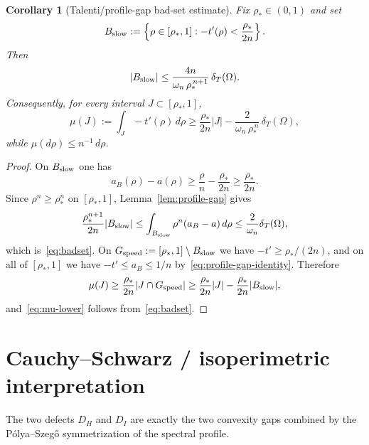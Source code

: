 \documentclass[11pt]{article}
\newtheorem{corollary}[theorem]{Corollary}
\theoremstyle{definition}
\newcommand{\Om}{\Omega}
\newcommand{\rstar}{\rho_{*}}
\begin{document}
\begin{corollary}[Talenti/profile-gap bad-set estimate]\label{cor:badset}
Fix $\rstar\in(0,1)$ and set
\[
   B_{\rm slow}:=\left\{\rho\in[\rstar,1]:
      -t'(\rho)<\frac{\rstar}{2n}\right\}.
\]
Then
\begin{equation}\label{eq:badset}
   |B_{\rm slow}|
   \le \frac{4n}{\omega_n\,\rstar^{\,n+1}}\,\delta_T(\Om).
\end{equation}
Consequently, for every interval $J\subset[\rstar,1]$,
\begin{equation}\label{eq:mu-lower}
   \mu(J):=\int_J -t'(\rho)\,d\rho
   \ge \frac{\rstar}{2n}|J|
      -\frac{2}{\omega_n\,\rstar^{\,n}}\,\delta_T(\Om),
\end{equation}
while $\mu(d\rho)\le n^{-1}\,d\rho$.
\end{corollary}

\begin{proof}
On $B_{\rm slow}$ one has
\[
   a_B(\rho)-a(\rho)\ge \frac{\rho}{n}-\frac{\rstar}{2n}
   \ge \frac{\rstar}{2n}.
\]
Since $\rho^n\ge\rstar^n$ on $[\rstar,1]$, Lemma~\ref{lem:profile-gap}
gives
\[
   \frac{\rstar^{n+1}}{2n}|B_{\rm slow}|
   \le \int_{B_{\rm slow}}\rho^n(a_B-a)\,d\rho
   \le \frac{2}{\omega_n}\delta_T(\Om),
\]
which is~\eqref{eq:badset}.  On
$G_{\rm speed}:=[\rstar,1]\setminus B_{\rm slow}$ we have
$-t'\ge\rstar/(2n)$, and on all of $[\rstar,1]$ we have
$-t'\le a_B\le1/n$ by~\eqref{eq:profile-gap-identity}.  Therefore
\[
   \mu(J)\ge \frac{\rstar}{2n}|J\cap G_{\rm speed}|
   \ge \frac{\rstar}{2n}|J|
       -\frac{\rstar}{2n}|B_{\rm slow}|,
\]
and~\eqref{eq:mu-lower} follows from~\eqref{eq:badset}.
\end{proof}

\section{Cauchy--Schwarz / isoperimetric interpretation}
\label{sec:CS}

The two defects $D_{H}$ and $D_{I}$ are exactly the two convexity gaps
combined by the P\'olya--Szeg\H{o} symmetrization of the spectral
profile.
\end{document}
